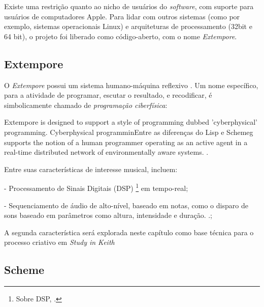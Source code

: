 Existe uma restrição quanto ao nicho de usuários do \emph{software}, com suporte para usuários de computadores Apple. Para lidar com outros sistemas (como por exemplo, sistemas operacionais Linux) e arquiteturas de processamento (32bit e 64 bit), o projeto foi liberado como código-aberto, com o nome \emph{Extempore}.

\subsection{Extempore}

O \emph{Extempore} possui um sistema humano-máquina reflexivo . Um nome específico, para a atividade de programar, escutar o resultado, e recodificar, é simbolicamente chamado de \emph{programação ciberfísica}:

\begin{citacao}
 {Extempore is designed to support a style of programming dubbed 'cyberphysical' programming. Cyberphysical programminEntre as diferenças do Lisp e Schemeg supports the notion of a human programmer operating as an active agent in a real-time distributed network of environmentally aware systems. . }
\end{citacao}

Entre suas características de interesse musical, incluem:

- Processamento de Sinais Digitais (DSP) \footnote{Sobre DSP, .} em  tempo-real;

- Sequenciamento de áudio de alto-nível, baseado em notas, como o disparo de sons baseado em parâmetros como altura, intensidade e duração. .;

A segunda característica será explorada neste capítulo como base técnica para o processo criativo em \emph{Study in Keith}

\subsection{Scheme}\label{sec:scheme}


